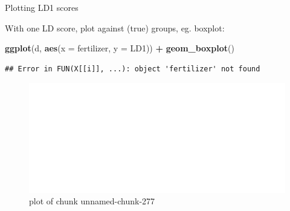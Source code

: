 \documentclass[ignorenonframetext,]{beamer}
\newenvironment{Shaded}{\begin{snugshade}}{\end{snugshade}}
\newcommand{\DataTypeTok}[1]{\textcolor[rgb]{0.13,0.29,0.53}{#1}}
\newcommand{\KeywordTok}[1]{\textcolor[rgb]{0.13,0.29,0.53}{\textbf{#1}}}
\newcommand{\NormalTok}[1]{#1}
\newcommand{\OperatorTok}[1]{\textcolor[rgb]{0.81,0.36,0.00}{\textbf{#1}}}
\newcommand{\StringTok}[1]{\textcolor[rgb]{0.31,0.60,0.02}{#1}}
\begin{document}
\begin{frame}[fragile]{Plotting LD1 scores}
\protect\hypertarget{plotting-ld1-scores}{}

With one LD score, plot against (true) groups, eg. boxplot:

\begin{Shaded}
\begin{Highlighting}[]
\KeywordTok{ggplot}\NormalTok{(d, }\KeywordTok{aes}\NormalTok{(}\DataTypeTok{x =}\NormalTok{ fertilizer, }\DataTypeTok{y =}\NormalTok{ LD1)) }\OperatorTok{+}\StringTok{ }\KeywordTok{geom_boxplot}\NormalTok{()}
\end{Highlighting}
\end{Shaded}

\begin{verbatim}
## Error in FUN(X[[i]], ...): object 'fertilizer' not found
\end{verbatim}

\begin{figure}
\centering
\includegraphics{figure/unnamed-chunk-277-1.pdf}
\caption{plot of chunk unnamed-chunk-277}
\end{figure}

\end{frame}
\end{document}

